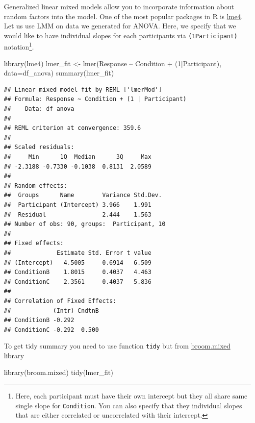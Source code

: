 \documentclass[
]{book}
\newenvironment{Shaded}{\begin{snugshade}}{\end{snugshade}}
\newcommand{\AttributeTok}[1]{\textcolor[rgb]{0.77,0.63,0.00}{#1}}
\newcommand{\DecValTok}[1]{\textcolor[rgb]{0.00,0.00,0.81}{#1}}
\newcommand{\FunctionTok}[1]{\textcolor[rgb]{0.00,0.00,0.00}{#1}}
\newcommand{\NormalTok}[1]{#1}
\newcommand{\OtherTok}[1]{\textcolor[rgb]{0.56,0.35,0.01}{#1}}
\newcommand{\SpecialCharTok}[1]{\textcolor[rgb]{0.00,0.00,0.00}{#1}}
\begin{document}
Generalized linear mixed models allow you to incorporate information about random factors into the model. One of the most popular packages in R is \href{https://github.com/lme4/lme4}{lme4}. Let us use LMM on data we generated for ANOVA. Here, we specify that we would like to have individual slopes for each participants via \texttt{(1\textbar{}Participant)} notation\footnote{Here, each participant must have their own intercept but they all share same single slope for \texttt{Condition}. You can also specify that they individual slopes that are either correlated or uncorrelated with their intercept.}.

\begin{Shaded}
\begin{Highlighting}[]
\FunctionTok{library}\NormalTok{(lme4)}
\NormalTok{lmer\_fit }\OtherTok{\textless{}{-}} \FunctionTok{lmer}\NormalTok{(Response }\SpecialCharTok{\textasciitilde{}}\NormalTok{ Condition }\SpecialCharTok{+}\NormalTok{ (}\DecValTok{1}\SpecialCharTok{|}\NormalTok{Participant), }\AttributeTok{data=}\NormalTok{df\_anova)}
\FunctionTok{summary}\NormalTok{(lmer\_fit)}
\end{Highlighting}
\end{Shaded}

\begin{verbatim}
## Linear mixed model fit by REML ['lmerMod']
## Formula: Response ~ Condition + (1 | Participant)
##    Data: df_anova
## 
## REML criterion at convergence: 359.6
## 
## Scaled residuals: 
##     Min      1Q  Median      3Q     Max 
## -2.3188 -0.7330 -0.1038  0.8131  2.0589 
## 
## Random effects:
##  Groups      Name        Variance Std.Dev.
##  Participant (Intercept) 3.966    1.991   
##  Residual                2.444    1.563   
## Number of obs: 90, groups:  Participant, 10
## 
## Fixed effects:
##             Estimate Std. Error t value
## (Intercept)   4.5005     0.6914   6.509
## ConditionB    1.8015     0.4037   4.463
## ConditionC    2.3561     0.4037   5.836
## 
## Correlation of Fixed Effects:
##            (Intr) CndtnB
## ConditionB -0.292       
## ConditionC -0.292  0.500
\end{verbatim}

To get tidy summary you need to use function \texttt{tidy} but from \href{https://github.com/bbolker/broom.mixed}{broom.mixed} library

\begin{Shaded}
\begin{Highlighting}[]
\FunctionTok{library}\NormalTok{(broom.mixed)}
\FunctionTok{tidy}\NormalTok{(lmer\_fit)}
\end{Highlighting}
\end{Shaded}
\end{document}
